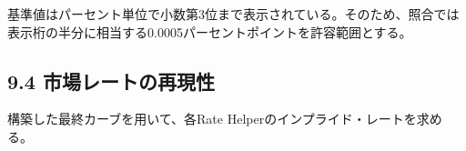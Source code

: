\documentclass[
  letterpaper,
  DIV=11,
  numbers=noendperiod]{scrreprt}
\newenvironment{Shaded}{\begin{snugshade}}{\end{snugshade}}
\newcommand{\FloatTok}[1]{\textcolor[rgb]{0.68,0.00,0.00}{#1}}
\newcommand{\FunctionTok}[1]{\textcolor[rgb]{0.28,0.35,0.67}{#1}}
\newcommand{\NormalTok}[1]{\textcolor[rgb]{0.00,0.23,0.31}{#1}}
\newcommand{\SpecialCharTok}[1]{\textcolor[rgb]{0.37,0.37,0.37}{#1}}
\begin{document}
\begin{Shaded}
\end{Shaded}

基準値はパーセント単位で小数第3位まで表示されている。そのため、照合では表示桁の半分に相当する0.0005パーセントポイントを許容範囲とする。

\subsection{9.4
市場レートの再現性}\label{ux5e02ux5834ux30ecux30fcux30c8ux306eux518dux73feux6027}

構築した最終カーブを用いて、各Rate
Helperのインプライド・レートを求める。
\end{document}
